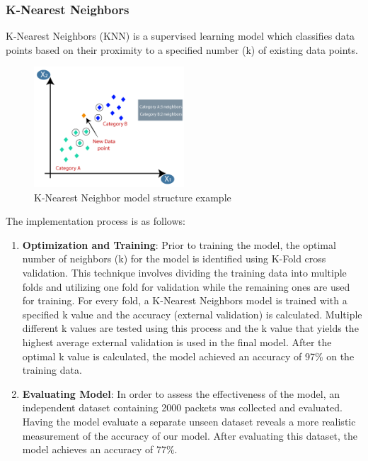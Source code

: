 \documentclass[10pt,sigconf,letterpaper,nonacm]{acmart}
\begin{document}
\subsubsection{K-Nearest Neighbors}
K-Nearest Neighbors (KNN) is a supervised learning model which classifies data points
based on their proximity to a specified number (k) of existing data points.
\begin{figure}[htp] 
  \centering
  \includegraphics[width=0.5\textwidth]{Figures_and_Graphs/knnExample.png}
  \caption{K-Nearest Neighbor model structure example}
  \label{fig:ExampleKNN}
\end{figure}

The implementation process is as follows: 
\begin{enumerate}
  \item \textbf{Optimization and Training}: Prior to training the model, the optimal number of neighbors (k) for the model is identified using K-Fold cross validation. This technique involves dividing the training data into multiple folds and utilizing one fold for validation while the remaining ones are used for training. For every fold, a K-Nearest Neighbors model is trained with a specified k value and the accuracy (external validation) is calculated. Multiple different k values are tested using this process and the k value that yields the highest average external validation is used in the final model. After the optimal k value is calculated, the model achieved an accuracy of 97\% on the training data. 
  
  \item \textbf{Evaluating Model}: In order to assess the effectiveness of the model, an independent dataset containing 2000 packets was collected and evaluated. Having the model evaluate a separate unseen dataset reveals a more realistic measurement of the accuracy of our model. After evaluating this dataset, the model achieves an accuracy of 77\%.
\end{enumerate}
\end{document}
